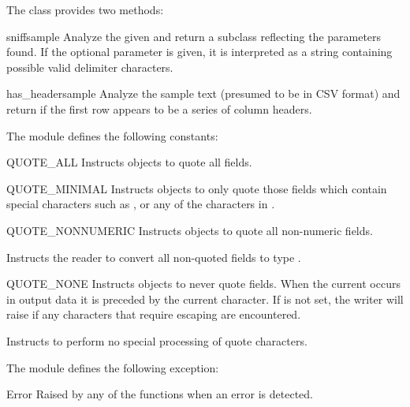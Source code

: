 The  class provides two methods:

\begin{methoddesc}{sniff}{sample}
Analyze the given  and return a  subclass
reflecting the parameters found.  If the optional  parameter
is given, it is interpreted as a string containing possible valid delimiter
characters.
\end{methoddesc}

\begin{methoddesc}{has_header}{sample}
Analyze the sample text (presumed to be in CSV format) and return
 if the first row appears to be a series of column
headers.
\end{methoddesc}


The  module defines the following constants:

\begin{datadesc}{QUOTE_ALL}
Instructs  objects to quote all fields.
\end{datadesc}

\begin{datadesc}{QUOTE_MINIMAL}
Instructs  objects to only quote those fields which contain
special characters such as ,  or any of the
characters in .
\end{datadesc}

\begin{datadesc}{QUOTE_NONNUMERIC}
Instructs  objects to quote all non-numeric
fields. 

Instructs the reader to convert all non-quoted fields to type .
\end{datadesc}

\begin{datadesc}{QUOTE_NONE}
Instructs  objects to never quote fields.  When the current
 occurs in output data it is preceded by the current
 character.  If  is not set, the writer
will raise  if any characters that require escaping
are encountered.

Instructs  to perform no special processing of quote characters.
\end{datadesc}


The  module defines the following exception:

\begin{excdesc}{Error}
Raised by any of the functions when an error is detected.
\end{excdesc}


